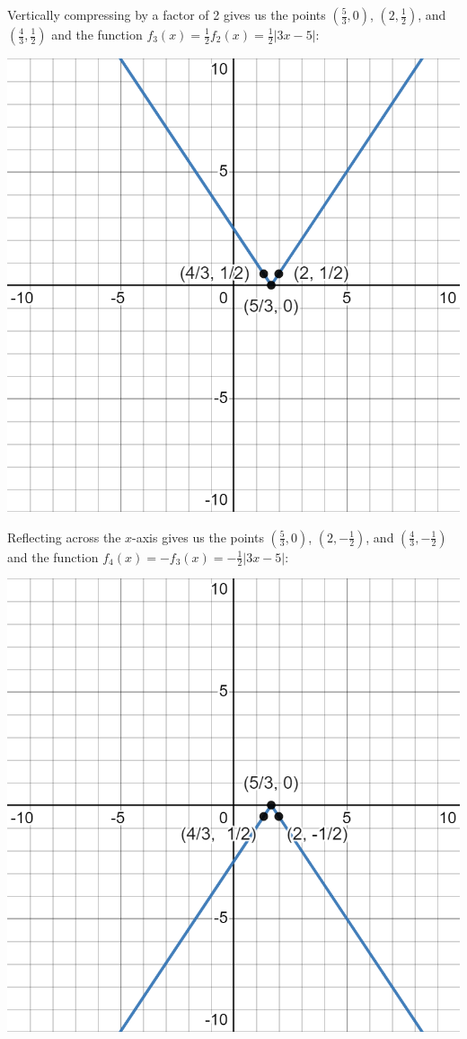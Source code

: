 \documentclass[handout, noauthor, nooutcomes]{ximera}
\begin{document}
\begin{example}
\begin{explanation}
Vertically compressing by a factor of 2 gives us the points $\left(\frac{5}{3}, 0\right)$, $\left(2, \frac{1}{2}\right)$, and $\left(\frac{4}{3}, \frac{1}{2}\right)$ and the function $f_3(x) = \frac{1}{2}f_2(x) = \frac{1}{2}|3x - 5|$:

\includegraphics[width=1\linewidth]{images/exgraph4.png}

Reflecting across the $x$-axis gives us the points $\left(\frac{5}{3}, 0\right)$, $\left(2, -\frac{1}{2}\right)$, and $\left(\frac{4}{3}, -\frac{1}{2}\right)$ and the function $f_4(x) = -f_3(x) = -\frac{1}{2}|3x - 5|$:

\includegraphics[width=1\linewidth]{images/exgraph5.png}


\end{explanation}
\end{example}
\end{document}
